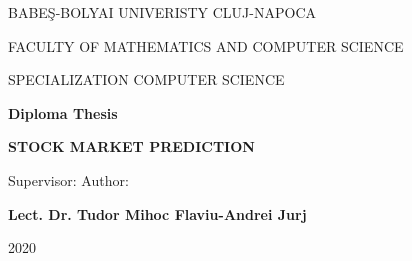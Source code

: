 \begin{titlepage}
	\begin{center}
		\Large{{BABEŞ-BOLYAI UNIVERISTY CLUJ-NAPOCA}} 
		
		\Large{{FACULTY OF MATHEMATICS AND COMPUTER SCIENCE}} 
		
		\Large{{SPECIALIZATION COMPUTER SCIENCE}}
		
		\vspace{6cm}
		
		\textbf{Diploma Thesis}
		
		\vspace{1cm}
		\Huge\textbf{{STOCK MARKET PREDICTION}}
		
	\end{center}
	\vspace{6cm}
	
	\hspace*{0.8cm}Supervisor: \hfill  Author: \hspace*{0.8cm} 
	
	\textbf{Lect. Dr. Tudor Mihoc  \hfill  \textbf{Flaviu-Andrei Jurj}}
	
	\vfill
	\begin{center}
		\Large{2020}
	\end{center}
\end{titlepage}  